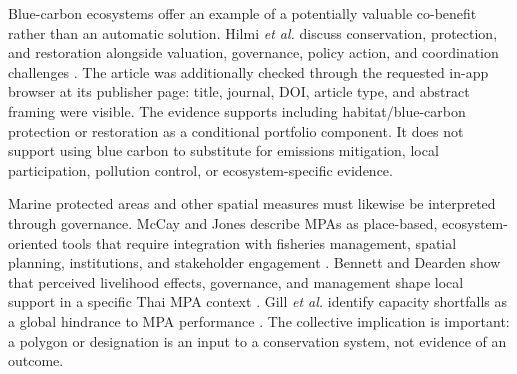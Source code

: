 \documentclass[conference]{IEEEtran}
\begin{document}
Blue-carbon ecosystems offer an example of a potentially valuable co-benefit rather than an automatic solution. Hilmi \emph{et al.} discuss conservation, protection, and restoration alongside valuation, governance, policy action, and coordination challenges \cite{hilmi2021}. The article was additionally checked through the requested in-app browser at its publisher page: title, journal, DOI, article type, and abstract framing were visible. The evidence supports including habitat/blue-carbon protection or restoration as a conditional portfolio component. It does not support using blue carbon to substitute for emissions mitigation, local participation, pollution control, or ecosystem-specific evidence.

Marine protected areas and other spatial measures must likewise be interpreted through governance. McCay and Jones describe MPAs as place-based, ecosystem-oriented tools that require integration with fisheries management, spatial planning, institutions, and stakeholder engagement \cite{mccay2011}. Bennett and Dearden show that perceived livelihood effects, governance, and management shape local support in a specific Thai MPA context \cite{bennett2013}. Gill \emph{et al.} identify capacity shortfalls as a global hindrance to MPA performance \cite{gill2017}. The collective implication is important: a polygon or designation is an input to a conservation system, not evidence of an outcome.
\end{document}
